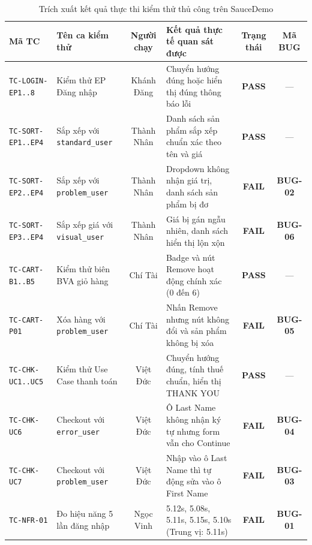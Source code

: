 \documentclass[a4paper]{article}
\begin{document}
\begin{table}[H]
\centering
\scriptsize
\setlength{\tabcolsep}{3.5pt}
\begin{tabularx}{\textwidth}{|l|>{\raggedright\arraybackslash}p{2.8cm}|c|>{\raggedright\arraybackslash}X|c|c|}
\hline
\textbf{Mã TC} & \textbf{Tên ca kiểm thử} & \textbf{Người chạy} & \textbf{Kết quả thực tế quan sát được} & \textbf{Trạng thái} & \textbf{Mã BUG} \\ \hline
\texttt{TC-LOGIN-EP1..8} & Kiểm thử EP Đăng nhập & Khánh Đăng & Chuyển hướng đúng hoặc hiển thị đúng thông báo lỗi & \textbf{PASS} & --- \\ \hline
\texttt{TC-SORT-EP1..EP4} & Sắp xếp với \texttt{standard\_user} & Thành Nhân & Danh sách sản phẩm sắp xếp chuẩn xác theo tên và giá & \textbf{PASS} & --- \\ \hline
\texttt{TC-SORT-EP2..EP4} & Sắp xếp với \texttt{problem\_user} & Thành Nhân & Dropdown không nhận giá trị, danh sách sản phẩm bị đơ & \textbf{FAIL} & \textbf{BUG-02} \\ \hline
\texttt{TC-SORT-EP3..EP4} & Sắp xếp giá với \texttt{visual\_user} & Thành Nhân & Giá bị gán ngẫu nhiên, danh sách hiển thị lộn xộn & \textbf{FAIL} & \textbf{BUG-06} \\ \hline
\texttt{TC-CART-B1..B5} & Kiểm thử biên BVA giỏ hàng & Chí Tài & Badge và nút Remove hoạt động chính xác (0 đến 6) & \textbf{PASS} & --- \\ \hline
\texttt{TC-CART-P01} & Xóa hàng với \texttt{problem\_user} & Chí Tài & Nhấn Remove nhưng nút không đổi và sản phẩm không bị xóa & \textbf{FAIL} & \textbf{BUG-05} \\ \hline
\texttt{TC-CHK-UC1..UC5} & Kiểm thử Use Case thanh toán & Việt Đức & Chuyển hướng đúng, tính thuế chuẩn, hiển thị THANK YOU & \textbf{PASS} & --- \\ \hline
\texttt{TC-CHK-UC6} & Checkout với \texttt{error\_user} & Việt Đức & Ô Last Name không nhận ký tự nhưng form vẫn cho Continue & \textbf{FAIL} & \textbf{BUG-04} \\ \hline
\texttt{TC-CHK-UC7} & Checkout với \texttt{problem\_user} & Việt Đức & Nhập vào ô Last Name thì tự động sửa vào ô First Name & \textbf{FAIL} & \textbf{BUG-03} \\ \hline
\texttt{TC-NFR-01} & Đo hiệu năng 5 lần đăng nhập & Ngọc Vinh & 5.12s, 5.08s, 5.11s, 5.15s, 5.10s (Trung vị: 5.11s) & \textbf{FAIL} & \textbf{BUG-01} \\ \hline
\end{tabularx}
\caption{Trích xuất kết quả thực thi kiểm thử thủ công trên SauceDemo}
\end{table}
\end{document}
